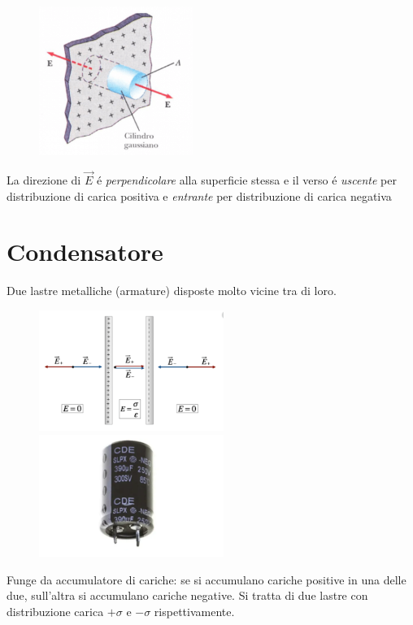 \documentclass[17pt]{article}
\begin{document}
\begin{figure}[th]
\includegraphics[width=5cm]{GaussLastraPiana.png}%
\centering
\end{figure}

La direzione di $\vec{E}$ \'e \emph{perpendicolare} alla superficie stessa e il verso \'e \emph{uscente} per distribuzione di carica positiva e \emph{entrante} per distribuzione di carica negativa





\section{Condensatore}

Due lastre metalliche (armature) disposte molto vicine tra di loro.


\begin{figure}[th]
\includegraphics[width=6cm]{CondensatoreFaccePianeParallele.png}%
\includegraphics[width=6cm]{Condensatore.png}%
\centering
\end{figure}

Funge da accumulatore di cariche: se si accumulano cariche positive in una delle due, sull'altra si accumulano cariche negative. Si tratta di due lastre con distribuzione carica $+\sigma$ e $-\sigma$ rispettivamente. 
\end{document}

